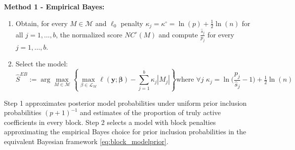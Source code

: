 \documentclass[aos]{imsart}
\theoremstyle{plain}
\newcommand{\paul}[1]{{\small{\color{green} \sf $\spadesuit$ Paul: #1}}}
\newcommand{\bs}{\boldsymbol}
\begin{document}
\textbf{Method 1 - Empirical Bayes:}
\begin{enumerate}
    \item Obtain, for every $M\in \mathcal{M}$ and $\ell_0$ penalty $\kappa_j=\kappa^{\circ}=\ln(p)+\frac{1}{2}\ln(n)$ for all $j=1,\ldots,b$, the normalized score $NC^{\circ}(M)$  and compute $\frac{\hat{s}_j}{p_j}$ for every $j=1,\ldots,b$.
    \item Select the model:
    \begin{equation*}
    \hat{S}^{EB}:= \arg\max_{M\in \mathcal{M}} \left\{\max_{\beta\in \mathcal{L}_M}\ell(\bs y; \bs \beta)-\sum_{j=1}^b\kappa_j |M_j| \right\}
    \text{where} \,\,\forall j\,\,\kappa_j = \ln\bigg(\frac{p_j}{\hat{s}_j}-1\bigg)+ \tfrac{1}{2}\ln(n)
    \end{equation*}
\end{enumerate}
Step 1 approximates posterior model probabilities under uniform prior inclusion probabilities $(p+1)^{-1}$ and estimates of the proportion of truly active coefficients in every block. Step 2 selects a model with block penalties approximating the empirical Bayes choice for prior inclusion probabilities in the equivalent Bayesian framework \eqref{eq:block_modelprior}. 
\end{document}
